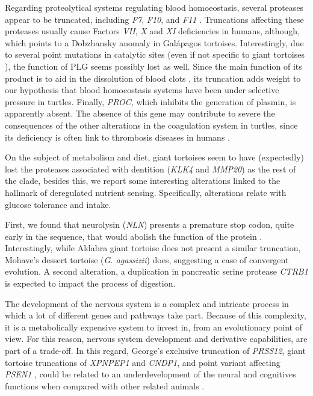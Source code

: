 Regarding proteolytical systems regulating blood homoeostasis, several proteases appear to be truncated, including \textit{F7}, \textit{F10}, and \textit{F11}%
.
Truncations affecting these proteases usually cause Factors \textsl{VII}, \textsl{X} and \textsl{XI} deficiencies in humans, although, which points to a Dobzhansky anomaly in Gal\'{a}pagos tortoises.
Interestingly, due to several point mutations in catalytic sites (even if not specific to giant tortoises%
), the function of PLG seems possibly lost as well.
Since the main function of its product is to aid in the dissolution of blood clots \cite{Wu2019}, its truncation adds weight to our hypothesis that blood homoeostasis systems have been under selective pressure in turtles.
Finally, \textit{PROC}, which inhibits the generation of plasmin, is apparently absent.
The absence of this gene may contribute to severe the consequences of the other alterations in the coagulation system in turtles, since its deficiency is often link to thrombosis diseases in humans \cite{Cheng2016}. 

On the subject of metabolism and diet, giant tortoises seem to have (expectedly) lost the proteases associated with dentition (\textit{KLK4} and \textit{MMP20}) as the rest of the clade, besides this, we report some interesting alterations linked to the hallmark of deregulated nutrient sensing.
Specifically, alterations relate with glucose tolerance and intake.

First, we found that neurolysin (\textit{NLN}) presents a premature stop codon, quite early in the sequence, that would abolish the function of the protein%
.
Interestingly, while Aldabra giant tortoise does not present a similar truncation, Mohave's dessert tortoise (\textit{G. agassizii}) does, suggesting a case of convergent evolution.
A second alteration, a duplication in pancreatic serine protease \textit{CTRB1} %
is expected to impact the process of digestion.

The development of the nervous system is a complex and intricate process in which a lot of different genes and pathways take part.
Because of this complexity, it is a metabolically expensive system to invest in, from an evolutionary point of view.
For this reason, nervous system development and derivative capabilities, are part of a trade-off.
In this regard, George's exclusive truncation of \textit{PRSS12}, giant tortoise truncations of \textit{XPNPEP1} and \textit{CNDP1}, and point variant affecting \textit{PSEN1}%
, could be related to an underdevelopment of the neural and cognitives functions when compared with other related animals \cite{Bellia2014,Jiang2015,Mitsui2013,Yoon2012}.

